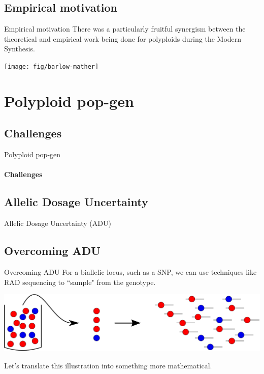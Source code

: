 \documentclass[presentation]{beamer}
\begin{document}
\subsection{Empirical motivation}

\begin{frame}[t]{Empirical motivation}
	There was a particularly fruitful synergism between the theoretical and empirical work being done for polyploids during the Modern Synthesis.
	\vspace{0.1in}
	
	\begin{center}
		\texttt{[image: fig/barlow-mather]}
	\end{center}
\end{frame}

\section{Polyploid pop-gen}

\subsection{Challenges}

\begin{frame}[t]{Polyploid pop-gen}
\framesubtitle{Challenges}



\end{frame}

\subsection{Allelic Dosage Uncertainty}

\begin{frame}[t]{Allelic Dosage Uncertainty (ADU)}

\end{frame}

\subsection{Overcoming ADU}

\begin{frame}[t]{Overcoming ADU}
	For a biallelic locus, such as a SNP, we can use techniques like RAD sequencing to ``sample" from the genotype.
	\vspace{0.2in}
	
	\begin{center}
		\includegraphics[width=\textwidth]{fig/pop-gen-model-empty}
	\end{center}
	
	\pause
	\vspace{0.1in}
	Let's translate this illustration into something more mathematical.
\end{frame}
\end{document}
